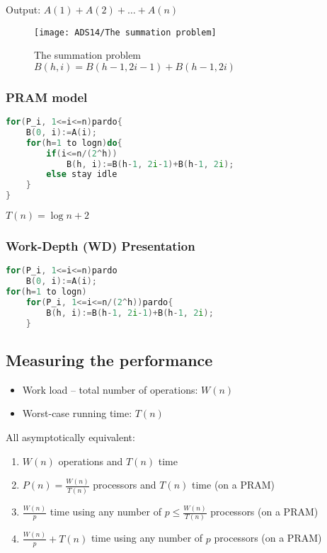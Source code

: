 Output: $A(1) + A(2) + \dots +A(n)$

\begin{figure}[!htb]
    \centering
    \texttt{[image: ADS14/The summation problem]}
    \caption{The summation problem $B(h,i)=B(h-1, 2i-1)+B(h-1, 2i)$}
\end{figure}

\subsubsection{PRAM model}
\begin{lstlisting}[language={c++}]
for(P_i, 1<=i<=n)pardo{
    B(0, i):=A(i);
    for(h=1 to logn)do{
        if(i<=n/(2^h))
            B(h, i):=B(h-1, 2i-1)+B(h-1, 2i);
        else stay idle
    }
}
\end{lstlisting}
$T(n)=\log n+2$

\subsubsection{Work-Depth (WD) Presentation}
\begin{lstlisting}[language={c++}]
for(P_i, 1<=i<=n)pardo
    B(0, i):=A(i);
for(h=1 to logn)
    for(P_i, 1<=i<=n/(2^h))pardo{
        B(h, i):=B(h-1, 2i-1)+B(h-1, 2i);
    }
\end{lstlisting}


\subsection{Measuring the performance}
\begin{itemize}
    \item Work load – total number of operations: $W(n)$
    \item Worst-case running time: $T(n)$
\end{itemize}

All asymptotically equivalent:
\begin{enumerate}\small
    \item  $W(n)$ operations and $T(n)$ time
    \item $P(n) = \frac{W(n)}{T(n)}$ processors and $T(n)$ time (on a PRAM)
    \item $\frac{W(n)}{p}$ time using any number of $p \le \frac{W(n)}{T(n)}$ processors (on a PRAM)
    \item $\frac{W(n)}{p} + T(n)$ time using any number of $p$ processors (on a PRAM)
\end{enumerate}


